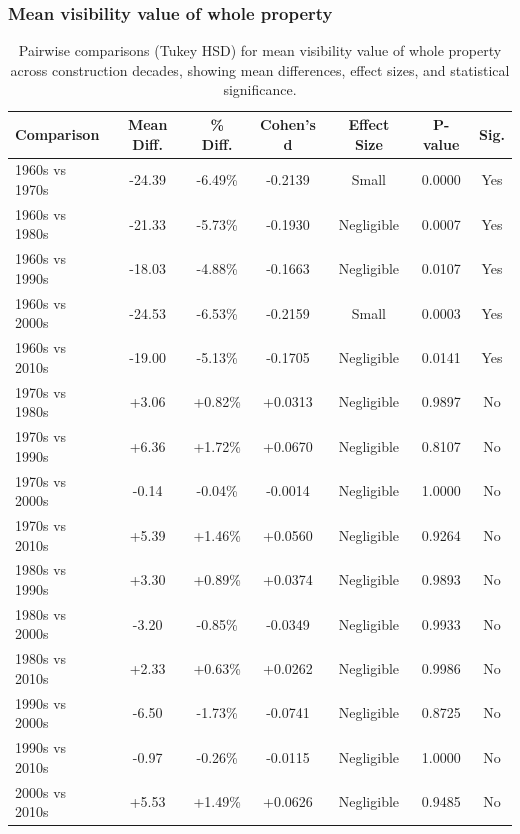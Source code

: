 \subsubsection{Mean visibility value of whole property}
\begin{table}[htbp]
    \centering
    \begin{tabular}{l|c|c|c|c|c|c}
    \hline
    \textbf{Comparison} & \textbf{Mean Diff.} & \textbf{\% Diff.} & \textbf{Cohen's d} & \textbf{Effect Size} & \textbf{P-value} & \textbf{Sig.} \\
    \hline
    1960s vs 1970s & -24.39 & -6.49\% & -0.2139 & Small & 0.0000 & Yes \\
    1960s vs 1980s & -21.33 & -5.73\% & -0.1930 & Negligible & 0.0007 & Yes \\
    1960s vs 1990s & -18.03 & -4.88\% & -0.1663 & Negligible & 0.0107 & Yes \\
    1960s vs 2000s & -24.53 & -6.53\% & -0.2159 & Small & 0.0003 & Yes \\
    1960s vs 2010s & -19.00 & -5.13\% & -0.1705 & Negligible & 0.0141 & Yes \\
    1970s vs 1980s & +3.06 & +0.82\% & +0.0313 & Negligible & 0.9897 & No \\
    1970s vs 1990s & +6.36 & +1.72\% & +0.0670 & Negligible & 0.8107 & No \\
    1970s vs 2000s & -0.14 & -0.04\% & -0.0014 & Negligible & 1.0000 & No \\
    1970s vs 2010s & +5.39 & +1.46\% & +0.0560 & Negligible & 0.9264 & No \\
    1980s vs 1990s & +3.30 & +0.89\% & +0.0374 & Negligible & 0.9893 & No \\
    1980s vs 2000s & -3.20 & -0.85\% & -0.0349 & Negligible & 0.9933 & No \\
    1980s vs 2010s & +2.33 & +0.63\% & +0.0262 & Negligible & 0.9986 & No \\
    1990s vs 2000s & -6.50 & -1.73\% & -0.0741 & Negligible & 0.8725 & No \\
    1990s vs 2010s & -0.97 & -0.26\% & -0.0115 & Negligible & 1.0000 & No \\
    2000s vs 2010s & +5.53 & +1.49\% & +0.0626 & Negligible & 0.9485 & No \\
    \hline
    \end{tabular}
    \caption{Pairwise comparisons (Tukey HSD) for mean visibility value of whole property across construction decades, showing mean differences, effect sizes, and statistical significance.}
    \label{tab:mean_vga_tukey_hsd}
\end{table}

